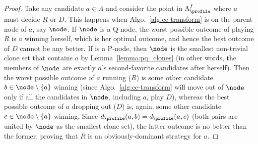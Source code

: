 \begin{proof}[Proof]
    Take any candidate $a\in A$ and consider the point in $\Lambda^f_{\profile}$ where $a$ must decide $R$ or $D$. This happens when Algo.~\ref{alg:cc-transform} is on the parent node of $a$, say $\node$. If $\node$ is a Q-node, the worst possible outcome of playing $R$ is $a$ winning herself, which is her optimal outcome, and hence the best outcome of $D$ cannot be any better. If is a P-node, then $\node$ is the smallest non-trivial clone set that contains $a$ by Lemma~\ref{lemma:pq_clones} (in other words, the members of $\node$ are exactly $a$'s second-favorite candidates after herself). Then the worst possible outcome of $a$ running ($R$) is some other candidate $b \in \node \setminus \{a\}$ winning (since Algo.~\ref{alg:cc-transform} will move out of $\node$ only if all the candidates in $\node$, including $a$, play $D$), whereas the best possible outcome of $a$ dropping out ($D$) is, again, some other candidate $c \in \node \setminus \{a\}$ winning. Since $d_{\profile}(a,b)=d_{\profile}(a,c)$ (both pairs are united by $\node$ as the smallest clone set), the latter outcome is no better than the former, proving  that $R$ is an obviously-dominant strategy for $a$. 
\end{proof}

